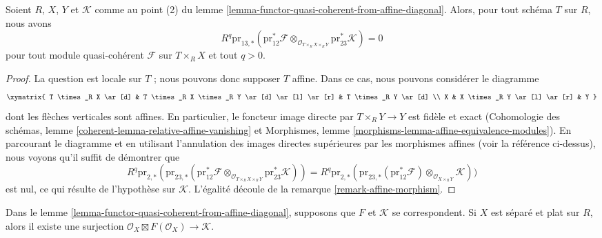\begin{lemma}
\label{lemma-persistence-exactness}
Soient $R$, $X$, $Y$ et $\mathcal{K}$ comme au point (2) du
lemme \ref{lemma-functor-quasi-coherent-from-affine-diagonal}.
Alors, pour tout schéma $T$ sur $R$, nous avons
$$
R^q\text{pr}_{13, *}(\text{pr}_{12}^*\mathcal{F}
\otimes_{\mathcal{O}_{T \times_R X \times_R Y}}
\text{pr}_{23}^*\mathcal{K}) = 0
$$
pour tout module quasi-cohérent $\mathcal{F}$ sur $T \times_R X$ et tout
$q > 0$.
\end{lemma}

\begin{proof}
La question est locale sur $T$ ; nous pouvons donc supposer $T$ affine.
Dans ce cas, nous pouvons considérer le diagramme
$$
\xymatrix{
T \times_R X \ar[d] &
T \times_R X \times_R Y \ar[d] \ar[l] \ar[r] &
T \times_R Y \ar[d] \\
X &
X \times_R Y \ar[l] \ar[r] &
Y
}
$$
dont les flèches verticales sont affines. En particulier, le foncteur image
directe par $T \times_R Y \to Y$ est fidèle et exact (Cohomologie des schémas,
lemme \ref{coherent-lemma-relative-affine-vanishing} et
Morphismes, lemme \ref{morphisms-lemma-affine-equivalence-modules}).
En parcourant le diagramme et en utilisant l'annulation des images directes
supérieures par les morphismes affines (voir la référence ci-dessus), nous
voyons qu'il suffit de démontrer que
$$
R^q\text{pr}_{2, *}(
\text{pr}_{23, *}(\text{pr}_{12}^*\mathcal{F}
\otimes_{\mathcal{O}_{T \times_R X \times_R Y}}
\text{pr}_{23}^*\mathcal{K})) =
R^q\text{pr}_{2, *}(
\text{pr}_{23, *}(\text{pr}_{12}^*\mathcal{F})
\otimes_{\mathcal{O}_{X \times_R Y}}
\mathcal{K}))
$$
est nul, ce qui résulte de l'hypothèse sur $\mathcal{K}$.
L'égalité découle de la remarque \ref{remark-affine-morphism}.
\end{proof}

\begin{lemma}
\label{lemma-functor-quasi-coherent-from-separated}
Dans le lemme \ref{lemma-functor-quasi-coherent-from-affine-diagonal},
supposons que $F$ et $\mathcal{K}$ se correspondent. Si $X$ est séparé et
plat sur $R$, alors il existe une surjection
$\mathcal{O}_X \boxtimes F(\mathcal{O}_X) \to \mathcal{K}$.
\end{lemma}

